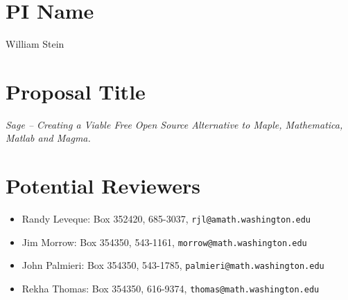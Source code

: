 \documentclass[11pt]{article}
\begin{document}
\mbox{}\vspace{4ex}

\section*{PI Name} 
William Stein

\vspace{3ex}
\section*{Proposal Title} 
{\em Sage -- Creating a Viable Free Open Source Alternative to 
Maple, Mathematica, Matlab and Magma.}

\vspace{3ex}

\section*{Potential Reviewers}

\begin{itemize}
\item Randy Leveque: Box 352420, 685-3037, {\tt rjl@amath.washington.edu}
\item Jim Morrow: Box 354350, 543-1161, {\tt morrow@math.washington.edu}
\item John Palmieri: Box 354350, 543-1785, {\tt palmieri@math.washington.edu}
\item Rekha Thomas: Box 354350, 616-9374, {\tt thomas@math.washington.edu}
\end{itemize}
\end{document}
